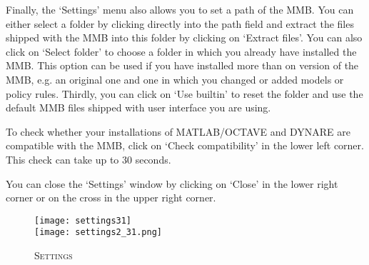Finally, the `Settings' menu also allows you to set a path of the MMB. You can either select a folder by clicking directly into the path field and extract the files shipped with the MMB into this folder by clicking on `Extract files'. You can also click on `Select folder' to choose a folder in which you already have installed the MMB. This option can be used if you have installed more than on version of the MMB, e.g. an original one and one in which you changed  or added models or policy rules. Thirdly, you can click on `Use builtin' to reset the folder and use the default MMB files shipped with user interface you are using.

To check whether your installations of MATLAB/OCTAVE and DYNARE are compatible with the MMB, click on `Check compatibility' in the lower left corner. This check can take up to 30 seconds. 

You can close the `Settings' window by clicking on `Close' in the lower right corner or on the cross in the upper right corner.

\begin{figure}[H]%
\centering
\caption{\textsc{Settings}}
\vspace{0.2cm}
\texttt{[image: settings31]}\\[1cm]
\texttt{[image: settings2\_31.png]}
\label{img:Settings}
\end{figure}






